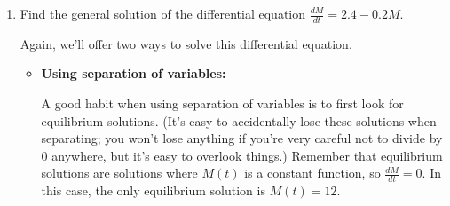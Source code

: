 \documentclass[main]{subfiles}
\begin{document}
\begin{enumerate}
\begin{solution}
\begin{itemize}
  \end{itemize}

  \end{solution}


  \item 
  
  \begin{problem}[3in]
  Find the general solution of the differential equation $\displaystyle
  \frac{dM}{dt} = 2.4 - 0.2M$.
  \end{problem}

  \begin{solution} 
  Again, we'll offer two ways to solve this differential equation.
  \begin{itemize}
    \item \textbf{Using separation of variables:}

    A good habit when using separation of variables is to first look for
    equilibrium solutions.  (It's easy to accidentally lose these
    solutions when separating; you won't lose anything if you're very
    careful not to divide by 0 anywhere, but it's easy to overlook
    things.)  Remember that equilibrium solutions are solutions where
    $M(t)$ is a constant function, so $\frac{dM}{dt} = 0$.  In this
    case, the only equilibrium solution is $M(t) = 12$.


\end{itemize}
\end{solution}
\end{enumerate}
\end{document}
